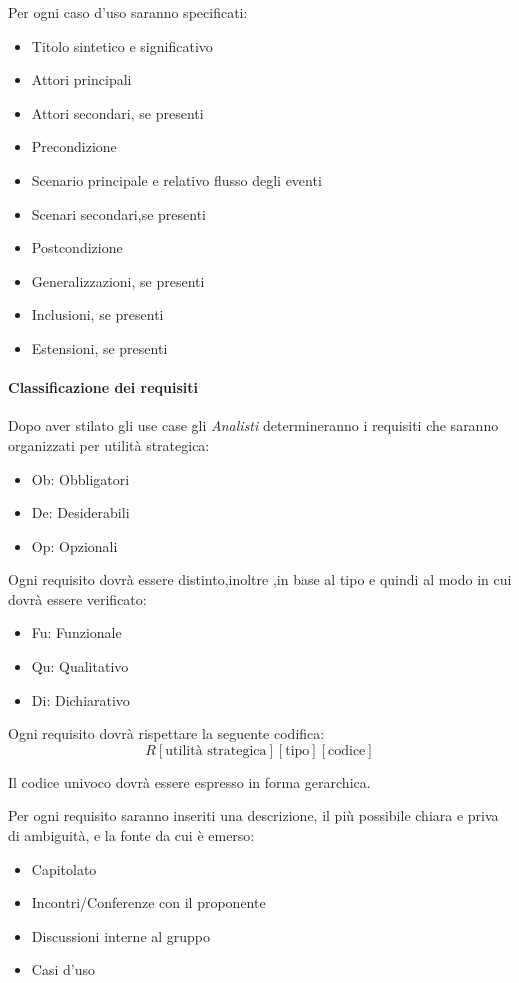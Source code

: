 Per ogni caso d'uso saranno specificati:

\begin{itemize}
\item Titolo sintetico e significativo
\item Attori principali
\item Attori secondari, se presenti
\item Precondizione
\item Scenario principale e relativo flusso degli eventi
\item Scenari secondari,se presenti
\item Postcondizione
\item Generalizzazioni, se presenti
\item Inclusioni, se presenti
\item Estensioni, se presenti
\end{itemize}


\paragraph{Classificazione dei requisiti}

Dopo aver stilato gli use case gli  \emph{Analisti}  determineranno i
requisiti che saranno organizzati per utilità strategica:
\begin{itemize}
\item Ob: Obbligatori
\item De: Desiderabili
\item Op: Opzionali
\end{itemize}
Ogni requisito dovrà essere distinto,inoltre ,in base al tipo e quindi al modo in cui dovrà essere verificato:
\begin{itemize}
\item Fu: Funzionale
\item Qu: Qualitativo
\item Di: Dichiarativo
\end{itemize}
Ogni requisito dovrà rispettare la seguente codifica:
$$ R[\text{utilità strategica}][\text{tipo}][\text{codice}] $$

Il codice univoco dovrà essere espresso in forma gerarchica.

Per ogni requisito saranno inseriti una descrizione, il più possibile
chiara e priva di ambiguità, e la fonte da cui è emerso: 
\begin{itemize}
\item Capitolato
\item Incontri/Conferenze con il proponente
\item Discussioni interne al gruppo
\item Casi d'uso
\end{itemize}



